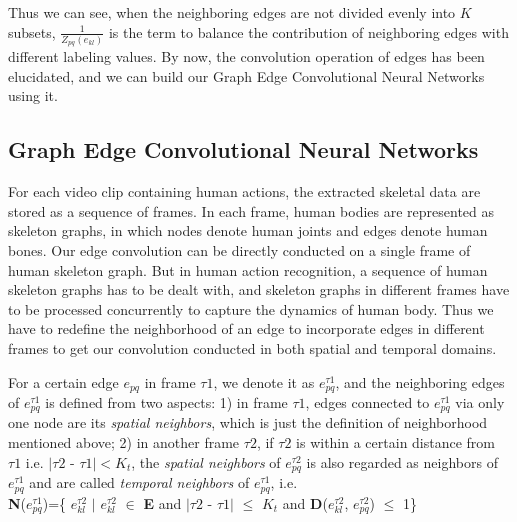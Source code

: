 \documentclass[a4paper,11pt]{article}
\begin{document}
Thus we can see, when the neighboring edges are not divided evenly into $K$ subsets, {\large $\frac{1}{Z_{pq}(e_{kl})}$} is the term  to balance the contribution of neighboring edges with different labeling values. By now, the convolution operation of edges has been elucidated, and we can build our Graph Edge Convolutional Neural Networks using it.




\subsection{Graph Edge Convolutional Neural Networks}
For each video clip containing human actions, the extracted skeletal data are stored as a sequence of frames. In each frame, human bodies are represented as skeleton graphs, in which nodes denote human joints and edges denote human bones.
Our edge convolution can be directly conducted on a single frame of human skeleton graph. But in human action recognition, a sequence of human skeleton graphs has to be dealt with, and skeleton graphs in different frames have to be processed concurrently to capture the dynamics of human body. Thus we have to redefine the neighborhood of an edge to incorporate edges in different frames to get our convolution conducted in both spatial and temporal domains.

For a certain edge $e_{pq}$ in frame $\tau1$, we denote it as $e_{pq}^{\tau 1}$, and the neighboring edges of $e_{pq}^{\tau 1}$ is defined from two aspects: 1) in frame $\tau 1$, edges connected to $e_{pq}^{\tau 1}$ via only one node are its {\it spatial neighbors}, which is just the definition of neighborhood mentioned above; 2) in another frame $\tau2$, if $\tau2$ is within a certain distance from $\tau1$ i.e. $| \tau 2 $ - $\tau 1 |<K_t$, the {\it spatial neighbors} of $e_{pq}^{\tau 2}$ is also regarded as neighbors of $e_{pq}^{\tau 1}$ and are called {\it temporal neighbors} of $e_{pq}^{\tau 1}$, i.e. \\
 {\bf N}($e_{pq}^{\tau 1}$)=\{ $e_{kl}^{\tau 2}$ $|$ $e_{kl}^{\tau 2}$ $\in$ {\bf E} and $| \tau 2 $ - $\tau 1 |$ $\leqslant$ $K_t$ and {\bf D}($e_{kl}^{\tau2}$, $e_{pq}^{\tau2}$) $\leqslant$ 1\}\\


\iffalse
\begin{align}
& {\bf N}(e_{pq}^{\tau 1})=\{e_{kl}^{\tau 2}|e_{kl}^{\tau 2} \in {\bf E} and | \tau 2  - \tau 1 | \le K_t \quad and \quad {\bf D}(e_{kl}^{\tau2}, e_{pq}^{\tau2}) \leqslant 1             \} &
\end{align}
\fi
\end{document}
